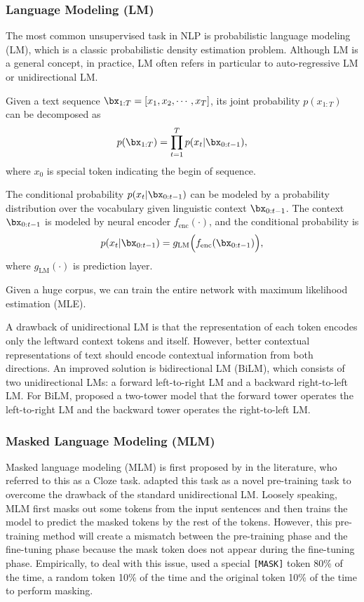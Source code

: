 \documentclass[fleqn]{SCYE-arxiv}
\begin{document}
\begin{multicols}{2}
\subsubsection{Language Modeling (LM)}

The most common unsupervised task in NLP is probabilistic language modeling (LM), which is a classic probabilistic density estimation problem.
Although LM is a general concept, in practice, LM often refers in particular to auto-regressive LM or unidirectional LM.

Given a text sequence $\bx_{1:T}=[x_1,x_2,\cdots,x_T ]$, its joint probability $p(x_{1:T})$ can be decomposed as
\begin{align}
p(\bx_{1:T}) = \prod_{t=1}^{T}p(x_t|\bx_{0:t-1}),
\end{align}
where $x_0$ is special token indicating the begin of sequence.

The conditional probability $p(x_t|\bx_{0:t-1})$ can be modeled by a probability distribution over the vocabulary given linguistic context $\bx_{0:t-1}$.
The context $\bx_{0:t-1}$ is modeled by neural encoder $f_{\mathrm{enc}}(\cdot)$, and the conditional probability is
\begin{align}
p(x_t|\bx_{0:t-1}) = g_{\mathrm{LM}}\Big( f_{\mathrm{enc}}(\bx_{0:t-1})\Big),
\end{align}
where $g_{\mathrm{LM}}(\cdot)$ is prediction layer.

Given a huge corpus, we can train the entire network with maximum likelihood estimation (MLE).

A drawback of unidirectional LM is that the representation of each token encodes only the leftward context tokens and itself. However, better contextual
representations of text should encode contextual information from both directions. An improved solution is bidirectional LM (BiLM), which consists of two unidirectional LMs:  a forward left-to-right LM and a backward right-to-left LM.
For BiLM, \citet{DBLP:conf/emnlp/BaevskiELZA19} proposed a two-tower model that the forward tower operates the left-to-right LM and the backward tower operates the right-to-left LM.


\subsubsection{Masked Language Modeling (MLM)}

Masked language modeling (MLM) is first proposed by \citet{doi:10.1177/107769905303000401} in the literature, who referred to this as a Cloze task. \citet{devlin2019bert} adapted this task as a novel pre-training task to overcome the drawback of the standard unidirectional LM. Loosely speaking, MLM first masks out some tokens from the input sentences and then trains the model to predict the masked tokens by the rest of the tokens. However, this pre-training method will create a mismatch between the pre-training phase and the fine-tuning phase because the mask token does not appear during the fine-tuning phase. Empirically, to deal with this issue, \citet{devlin2019bert} used a special \texttt{[MASK]} token 80\% of the time, a random token 10\% of the time and the original token 10\% of the time to perform masking.


\end{multicols}
\end{document}
